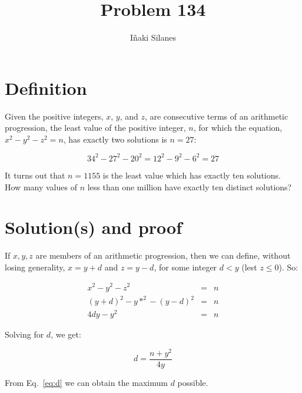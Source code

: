 \documentclass[english]{article}
\begin{document}
\newcommand{\mc}{\multicolumn}
\newcommand{\mr}{\multirow}
\newcommand{\cw}{\columnwidth}
\newcommand{\ig}[2]{\texttt{[image: \#2]}}

\title{Problem 134}
\author{I\~naki Silanes}
\maketitle

\section{Definition}

Given the positive integers, $x$, $y$, and $z$, are consecutive terms of an arithmetic progression, the least value of the positive integer, $n$, for which the equation, $x^2 - y^2 - z^2 = n$, has exactly two solutions is $n = 27$:

\begin{equation}
34^2 - 27^2 - 20^2 = 12^2 - 9^2 - 6^2 = 27
\end{equation}

It turns out that $n = 1155$ is the least value which has exactly ten solutions.\\

How many values of $n$ less than one million have exactly ten distinct solutions?

\section{Solution(s) and proof}

If ${x,y,z}$ are members of an arithmetic progression, then we can define, without losing generality, $x = y + d$ and $z = y - d$, for some integer $d < y$ (lest $z \leq 0$). So:

\begin{eqnarray}
x^2 - y^2 - z^2 & = & n \\
(y+d)^2 - y*^2 - (y-d)^2 & = & n \\
4 d y - y^2 & = & n
\end{eqnarray}

Solving for $d$, we get:

\begin{equation}
d = \frac{n+y^2}{4y} \label{eq:d}
\end{equation}

From Eq.~\ref{eq:d} we can obtain the maximum $d$ possible.
\end{document}
